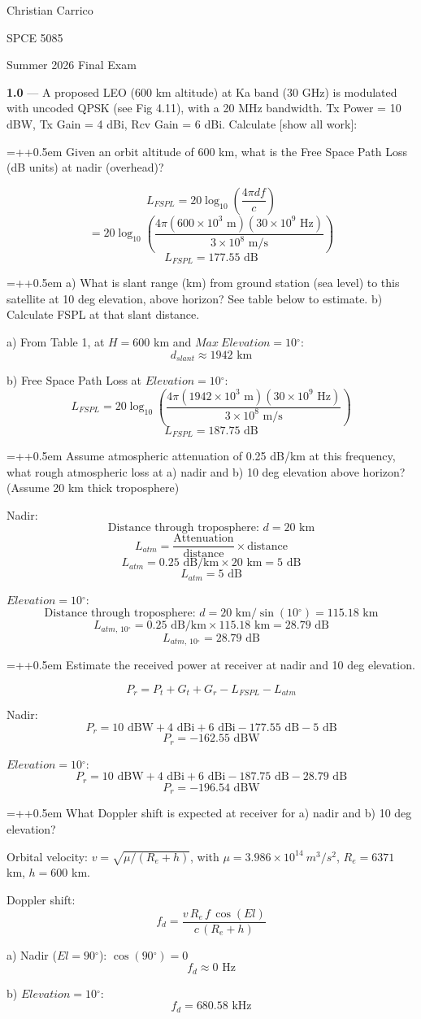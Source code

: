 \documentclass[12pt]{article}
\newcommand{\ans}[1]{\boxed{#1}}
\newlength{\subproblemindent}
\newlength{\subproblemlabelwidth}
\newlength{\solutionindent}
\newcommand{\degree}{\ensuremath{^{\circ}}}
\newcommand{\problem}[2]{\vspace{1em}\noindent\textbf{#1} --- #2\par\vspace{0.25em}}
\newcommand{\subproblem}[2]{%
  \par\vspace{0.5em}%
  \noindent
  \hangindent=\dimexpr\subproblemindent+\subproblemlabelwidth+0.5em\relax
  \hangafter=1
  \hspace*{\subproblemindent}%
  \makebox[\subproblemlabelwidth][l]{\textbf{#1}}#2\par
}
\newcommand{\solution}[1]{%
  \par\vspace{0.0em}%
  \begin{list}{}{
    \setlength{\leftmargin}{\solutionindent}
    \setlength{\rightmargin}{0pt}
    \setlength{\listparindent}{0pt}
    \setlength{\itemindent}{0pt}
    \setlength{\parsep}{0pt}
  }%
    \item\relax
    \begingroup
      \setlength{\baselineskip}{1.5\baselineskip}
      \setlength{\lineskip}{1.5\lineskip}
      \setlength{\parskip}{0pt}
      \everymath{\displaystyle}
      #1
      \par
    \endgroup
  \end{list}%
  \vspace{0.25em}%
}
\renewcommand{\proof}[1]{%
  \par\vspace{0.0em}%
  \begin{list}{}{
    \setlength{\leftmargin}{\solutionindent}
    \setlength{\rightmargin}{0pt}
    \setlength{\listparindent}{0pt}
    \setlength{\itemindent}{0pt}
    \setlength{\parsep}{0pt}
  }%
    \item\relax
    \begingroup
      \setlength{\baselineskip}{1.5\baselineskip}
      \setlength{\lineskip}{1.5\lineskip}
      \setlength{\parskip}{0pt}
      \everymath{\displaystyle}
      \centering
      #1
      \par
    \endgroup
  \end{list}%
  \vspace{0.25em}%
}
\begin{document}
\hfill Christian Carrico

\hfill SPCE 5085

\hfill Summer 2026 Final Exam

\problem{1.0}{A proposed LEO (600 km altitude) at Ka band (30 GHz) is modulated with uncoded QPSK (see Fig 4.11), with a 20 MHz bandwidth. Tx Power = 10 dBW, Tx Gain = 4 dBi, Rcv Gain = 6 dBi. Calculate [show all work]:}
\subproblem{i.}{Given an orbit altitude of 600 km, what is the Free Space Path Loss (dB units) at nadir (overhead)?}
\proof{
$$L_{FSPL} = 20\log_{10}\left(\frac{4\pi d f}{c}\right)$$
$$= 20\log_{10}\left(\frac{4\pi (600\times10^3\text{ m})(30\times10^9\text{ Hz})}{3\times10^8\text{ m/s}}\right)$$
$$\ans{L_{FSPL} = 177.55 \text{ dB}}$$
}
\subproblem{ii.}{a) What is slant range (km) from ground station (sea level) to this satellite at 10 deg elevation, above horizon? See table below to estimate. b) Calculate FSPL at that slant distance.}
\solution{
a) From Table 1, at $H=600$ km and $Max\ Elevation=10\degree$:
$$\ans{d_{slant} \approx 1942 \text{ km}}$$

b) Free Space Path Loss at $Elevation=10\degree$:
$$L_{FSPL} = 20\log_{10}\left(\frac{4\pi (1942\times10^3\text{ m})(30\times10^9\text{ Hz})}{3\times10^8\text{ m/s}}\right)$$
$$\ans{L_{FSPL} = 187.75 \text{ dB}}$$
}
\subproblem{iii.}{Assume atmospheric attenuation of 0.25 dB/km at this frequency, what rough atmospheric loss at a) nadir and b) 10 deg elevation above horizon? (Assume 20 km thick troposphere)}
\solution{

Nadir:
$$\text{Distance through troposphere: } d = 20 \text{ km}$$
$$L_{atm} = \frac{\text{Attenuation}}{\text{distance}} \times \text{distance}$$
$$L_{atm} = 0.25\text{ dB/km} \times 20\text{ km} = 5 \text{ dB}$$
$$\ans{L_{atm} = 5 \text{ dB}}$$

$Elevation=10\degree$:
$$\text{Distance through troposphere: } d = 20\text{ km}/\sin(10\degree) = 115.18 \text{ km}$$
$$L_{atm,\,10\degree} = 0.25\text{ dB/km} \times 115.18\text{ km} = 28.79 \text{ dB}$$
$$\ans{L_{atm,\,10\degree} = 28.79 \text{ dB}}$$
}
\subproblem{iv.}{Estimate the received power at receiver at nadir and 10 deg elevation.}
\solution{
$$P_r = P_t + G_t + G_r - L_{FSPL} - L_{atm}$$

Nadir:
$$P_r = 10\text{ dBW} + 4\text{ dBi} + 6\text{ dBi} - 177.55\text{ dB} - 5\text{ dB}$$
$$\ans{P_{r} = -162.55 \text{ dBW}}$$

$Elevation = 10\degree$:
$$P_r = 10\text{ dBW} + 4\text{ dBi} + 6\text{ dBi} - 187.75\text{ dB} - 28.79\text{ dB}$$
$$\ans{P_{r} = -196.54 \text{ dBW}}$$
}
\subproblem{v.}{What Doppler shift is expected at receiver for a) nadir and b) 10 deg elevation?}
\solution{
Orbital velocity: $v = \sqrt{\mu/(R_e+h)}$, with $\mu = 3.986\times10^{14}\ m^3/s^2$, $R_e = 6371$ km, $h=600$ km.

Doppler shift: $$f_d = \frac{v\,R_e\,f\,\cos(El)}{c\,(R_e+h)}$$

a) Nadir ($El=90\degree$): $\cos(90\degree)=0$
$$\ans{f_{d} \approx 0 \text{ Hz}}$$

b) $Elevation = 10\degree$:
$$\ans{f_{d} = 680.58 \text{ kHz}}$$
}
\end{document}
